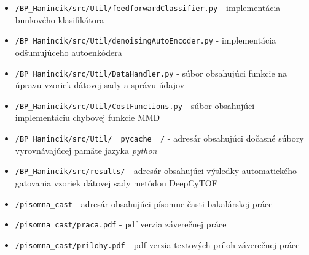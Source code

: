 \begin{itemize}
    \item \texttt{/BP_Hanincik/src/Util/feedforwardClassifier.py} - implementácia bunkového klasifikátora
    \item \texttt{/BP_Hanincik/src/Util/denoisingAutoEncoder.py} - implementácia odšumujúceho autoenkódera
    \item \texttt{/BP_Hanincik/src/Util/DataHandler.py} - súbor obsahujúci funkcie na úpravu vzoriek dátovej sady a správu údajov
    \item \texttt{/BP_Hanincik/src/Util/CostFunctions.py} - súbor obsahujúci implementáciu chybovej funkcie MMD 
    \item \texttt{/BP_Hanincik/src/Util/__pycache__/} - adresár obsahujúci dočasné súbory vyrovnávajúcej pamäte jazyka \textit{python}
    \item \texttt{/BP_Hanincik/src/results/} - adresár obsahujúci výsledky automatického gatovania vzoriek dátovej sady metódou DeepCyTOF
    \item \texttt{/pisomna_cast} - adresár obsahujúci písomne časti bakalárskej práce
    \item \texttt{/pisomna_cast/praca.pdf} - pdf verzia záverečnej práce
    \item \texttt{/pisomna_cast/prilohy.pdf} - pdf verzia textových príloh záverečnej práce
\end{itemize}